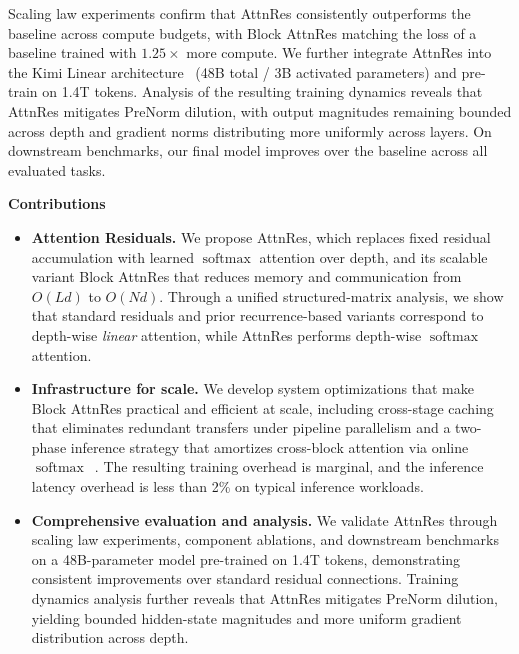 Scaling law experiments confirm that AttnRes consistently outperforms the baseline across compute budgets, with Block AttnRes matching the loss of a baseline trained with $1.25\times$ more compute. We further integrate AttnRes into the Kimi Linear architecture~\cite{zhang2025kimi} (48B total / 3B activated parameters) and pre-train on 1.4T tokens. Analysis of the resulting training dynamics reveals that AttnRes mitigates PreNorm dilution, with output magnitudes remaining bounded across depth and gradient norms distributing more uniformly across layers. On downstream benchmarks, our final model improves over the baseline across all evaluated tasks.

\textbf{Contributions}

\begin{itemize}[leftmargin=*]
    \item \textbf{Attention Residuals.} We propose AttnRes, which replaces fixed residual accumulation with learned $\operatorname{softmax}$ attention over depth, and its scalable variant Block AttnRes that reduces memory and communication from $O(Ld)$ to $O(Nd)$. Through a unified structured-matrix analysis, we show that standard residuals and prior recurrence-based variants correspond to depth-wise \emph{linear} attention, while AttnRes performs depth-wise $\operatorname{softmax}$ attention.
    \item \textbf{Infrastructure for scale.} We develop system optimizations that make Block AttnRes practical and efficient at scale, including cross-stage caching that eliminates redundant transfers under pipeline parallelism and a two-phase inference strategy that amortizes cross-block attention via online $\operatorname{softmax}$~\citep{milakov2018online}. The resulting training overhead is marginal, and the inference latency overhead is less than 2\% on typical inference workloads.
    \item \textbf{Comprehensive evaluation and analysis.} We validate AttnRes through scaling law experiments, component ablations, and downstream benchmarks on a 48B-parameter model pre-trained on 1.4T tokens, demonstrating consistent improvements over standard residual connections. Training dynamics analysis further reveals that AttnRes mitigates PreNorm dilution, yielding bounded hidden-state magnitudes and more uniform gradient distribution across depth.
\end{itemize}

\newpage













